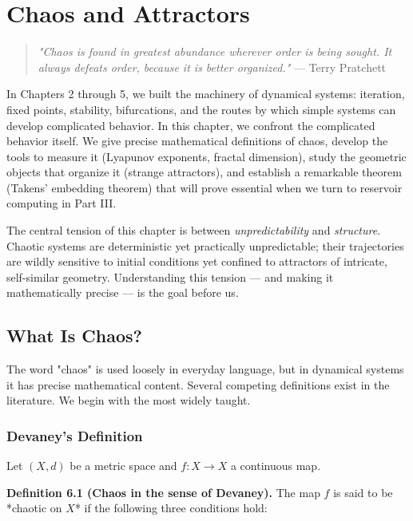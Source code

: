 \chapter{Chaos and Attractors}\label{ch:6}

\begin{quote}
\textit{"Chaos is found in greatest abundance wherever order is being sought. It always defeats order, because it is better organized."}
--- Terry Pratchett
\end{quote}

In Chapters 2 through 5, we built the machinery of dynamical systems: iteration, fixed points, stability, bifurcations, and the routes by which simple systems can develop complicated behavior. In this chapter, we confront the complicated behavior itself. We give precise mathematical definitions of chaos, develop the tools to measure it (Lyapunov exponents, fractal dimension), study the geometric objects that organize it (strange attractors), and establish a remarkable theorem (Takens' embedding theorem) that will prove essential when we turn to reservoir computing in Part III.

The central tension of this chapter is between \textit{unpredictability} and \textit{structure}. Chaotic systems are deterministic yet practically unpredictable; their trajectories are wildly sensitive to initial conditions yet confined to attractors of intricate, self-similar geometry. Understanding this tension --- and making it mathematically precise --- is the goal before us.


\bigskip


\section{What Is Chaos?}\label{sec:6.1}

The word "chaos" is used loosely in everyday language, but in dynamical systems it has precise mathematical content. Several competing definitions exist in the literature. We begin with the most widely taught.

\subsection{Devaney's Definition}\label{sec:6.1.1}

Let $(X, d)$ be a metric space and $f: X \to X$ a continuous map.

\textbf{Definition 6.1 (Chaos in the sense of Devaney).} The map $f$ is said to be *chaotic on $X$* if the following three conditions hold:


